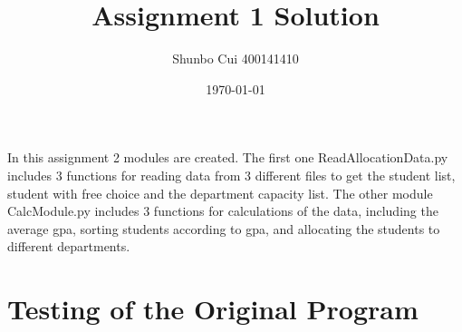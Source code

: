 \documentclass[12pt]{article}
\title{Assignment 1 Solution}
\author{Shunbo Cui 400141410}
\date{\today}
\begin{document}
\maketitle

In this assignment 2 modules are created. The first one ReadAllocationData.py includes 3 functions for reading data from 3 different files to get the student list, student with free choice and the department capacity list. The other module CalcModule.py includes 3 functions for calculations of the data, including the average gpa, sorting students according to gpa, and allocating the students to different departments.

\section{Testing of the Original Program}
\end{document}
